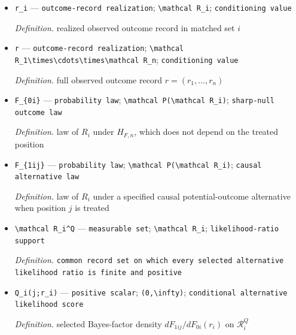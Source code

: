 \documentclass{article}
\begin{document}
\begin{itemize}
  \item \texttt{r\_\allowbreak{}i} --- \texttt{outcome-\allowbreak{}record realization}; \texttt{\textbackslash{}\allowbreak{}mathcal R\_\allowbreak{}i}; \texttt{conditioning value}
  \par\smallskip\noindent\emph{Definition.} realized observed outcome record in matched set \(i\)
  \item \texttt{r} --- \texttt{outcome-\allowbreak{}record realization}; \texttt{\textbackslash{}\allowbreak{}mathcal R\_\allowbreak{}1\textbackslash{}\allowbreak{}times\textbackslash{}\allowbreak{}cdots\textbackslash{}\allowbreak{}times\textbackslash{}\allowbreak{}mathcal R\_\allowbreak{}n}; \texttt{conditioning value}
  \par\smallskip\noindent\emph{Definition.} full observed outcome record \(r=(r_1,\ldots,r_n)\)
  \item \texttt{F\_\allowbreak{}\{0i\}\allowbreak{}} --- \texttt{probability law}; \texttt{\textbackslash{}\allowbreak{}mathcal P(\textbackslash{}\allowbreak{}mathcal R\_\allowbreak{}i)}; \texttt{sharp-\allowbreak{}null outcome law}
  \par\smallskip\noindent\emph{Definition.} law of \(R_i\) under \(H_{F,n}\), which does not depend on the treated position
  \item \texttt{F\_\allowbreak{}\{1ij\}\allowbreak{}} --- \texttt{probability law}; \texttt{\textbackslash{}\allowbreak{}mathcal P(\textbackslash{}\allowbreak{}mathcal R\_\allowbreak{}i)}; \texttt{causal alternative law}
  \par\smallskip\noindent\emph{Definition.} law of \(R_i\) under a specified causal potential-outcome alternative when position \(j\) is treated
  \item \texttt{\textbackslash{}\allowbreak{}mathcal R\_\allowbreak{}i\textasciicircum{}Q} --- \texttt{measurable set}; \texttt{\textbackslash{}\allowbreak{}mathcal R\_\allowbreak{}i}; \texttt{likelihood-\allowbreak{}ratio support}
  \par\smallskip\noindent\emph{Definition.} \texttt{common record set on which every selected alternative likelihood ratio is finite and positive}
  \item \texttt{Q\_\allowbreak{}i(j;\allowbreak{}r\_\allowbreak{}i)} --- \texttt{positive scalar}; \texttt{(0,\allowbreak{}\textbackslash{}\allowbreak{}infty)}; \texttt{conditional alternative likelihood score}
  \par\smallskip\noindent\emph{Definition.} selected Bayes-factor density \(dF_{1ij}/dF_{0i}(r_i)\) on \(\mathcal R_i^Q\)

\end{itemize}
\end{document}
